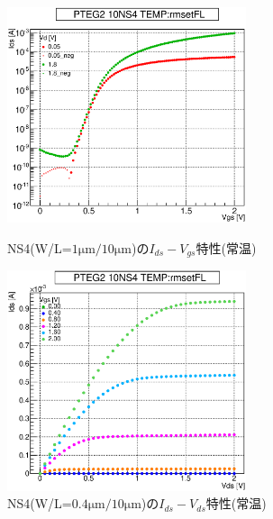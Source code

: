 				\begin{figure}[htbp]
					\begin{minipage}{0.5\hsize}
						\begin{center}
							\includegraphics[width=70mm]{./Chapter/Appendix/Picture/NST/NS4/PTEG2_10_NS4_IdVg_rmsetFL.eps}
						\end{center}
						\caption{NS4(W/L=$1\mathrm{\mu m}/10\mathrm{\mu m}$)の$I_{ds}-V_{gs}$特性(常温)}
						\label{fig:NS4_IdVg_room}
					\end{minipage}
					\begin{minipage}{0.5\hsize}
						\begin{center}
							\includegraphics[width=70mm]{./Chapter/Appendix/Picture/NST/NS4/PTEG2_10_NS4_IdVd_rmsetFL.eps}
						\end{center}
						\caption{NS4(W/L=$0.4\mathrm{\mu m}/10\mathrm{\mu m}$)の$I_{ds}-V_{ds}$特性(常温)}
						\label{fig:NS4_IdVd_room}
					\end{minipage}
				\end{figure}
